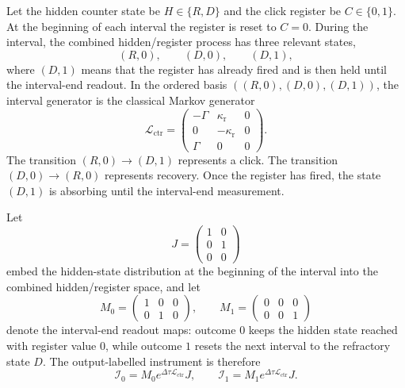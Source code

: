 Let the hidden counter state be $H\in\{R,D\}$ and the click register be $C\in\{0,1\}$. At the beginning of each interval the register is reset to $C=0$. During the interval, the combined hidden/register process has three relevant states,
\[
(R,0),\qquad (D,0),\qquad (D,1),
\]
where $(D,1)$ means that the register has already fired and is then held until the interval-end readout. In the ordered basis $((R,0),(D,0),(D,1))$, the interval generator is the classical Markov generator
\begin{equation}\label{eq:register-generator}
\mathcal L_{\mathrm{ctr}}=
\begin{pmatrix}
-\Gamma & \kappa_{\mathrm r} & 0\\
0 & -\kappa_{\mathrm r} & 0\\
\Gamma & 0 & 0
\end{pmatrix}.
\end{equation}
The transition $(R,0)\to(D,1)$ represents a click. The transition $(D,0)\to(R,0)$ represents recovery. Once the register has fired, the state $(D,1)$ is absorbing until the interval-end measurement.

Let
\[
J=
\begin{pmatrix}
1 & 0\\
0 & 1\\
0 & 0
\end{pmatrix}
\]
embed the hidden-state distribution at the beginning of the interval into the combined hidden/register space, and let
\[
M_0=
\begin{pmatrix}
1 & 0 & 0\\
0 & 1 & 0
\end{pmatrix},
\qquad
M_1=
\begin{pmatrix}
0 & 0 & 0\\
0 & 0 & 1
\end{pmatrix}
\]
denote the interval-end readout maps: outcome $0$ keeps the hidden state reached with register value $0$, while outcome $1$ resets the next interval to the refractory state $D$. The output-labelled instrument is therefore
\begin{equation}\label{eq:instrument-main}
\mathcal I_0=M_0e^{\Delta\tau\mathcal L_{\mathrm{ctr}}}J,
\qquad
\mathcal I_1=M_1e^{\Delta\tau\mathcal L_{\mathrm{ctr}}}J.
\end{equation}

